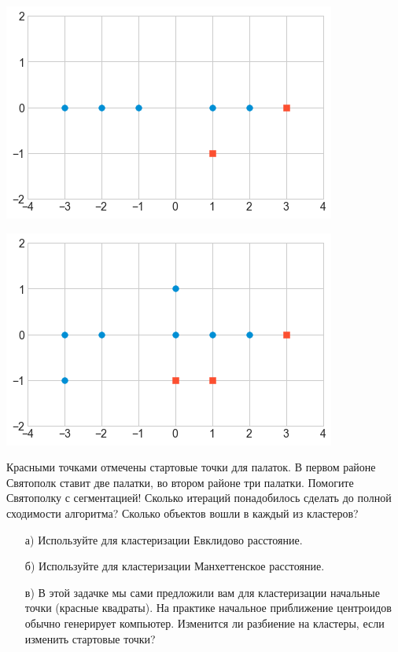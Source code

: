 \documentclass[12pt, a4paper, oneside]{article}
\begin{document}
\begin{minipage}[t]{0.45\textwidth}
\includegraphics[scale=0.5]{knn1.png}
\end{minipage}
\hfill
\begin{minipage}[t]{0.45\textwidth}
\includegraphics[scale=0.5]{knn2.png}
\end{minipage}

Красными точками отмечены стартовые точки для палаток. В первом районе Святополк ставит две палатки, во втором районе три палатки.  Помогите Святополку с сегментацией! Сколько итераций понадобилось сделать до полной сходимости алгоритма? Сколько объектов вошли в каждый из кластеров?  

\begin{enumerate}
	\item[а)] Используйте для кластеризации Евклидово расстояние.
	\item[б)] Используйте для кластеризации Манхеттенское расстояние.
	\item[в)] В этой задачке мы сами предложили вам для кластеризации начальные точки (красные квадраты). На практике начальное приближение центроидов обычно генерирует компьютер.  Изменится ли разбиение на кластеры, если изменить стартовые точки?
\end{enumerate}
\end{document}
